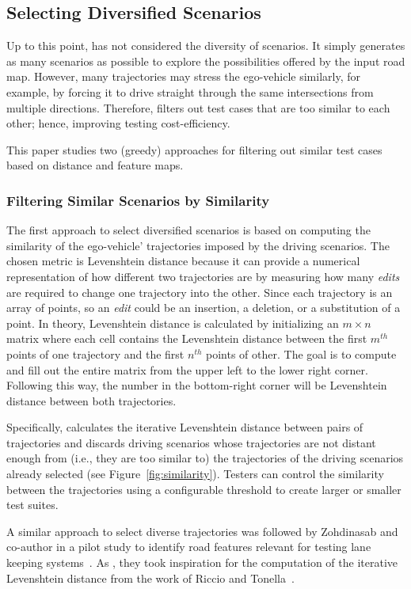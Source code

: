 \documentclass[conference]{IEEEtran}
\begin{document}
\subsection{Selecting Diversified Scenarios}
Up to this point, \tool has not considered the diversity of scenarios. It simply generates as many scenarios as possible to explore the possibilities offered by the input road map. However, many trajectories may stress the ego-vehicle similarly, for example, by forcing it to drive straight through the same intersections from multiple directions. Therefore, \tool filters out test cases that are too similar to each other; hence, improving testing cost-efficiency.

This paper studies two (greedy) approaches for filtering out similar test cases based on distance and feature maps.

\subsubsection{Filtering Similar Scenarios by Similarity}
The first approach to select diversified scenarios is based on computing the similarity of the ego-vehicle' trajectories imposed by the driving scenarios. The chosen metric is Levenshtein distance because it can provide a numerical representation of how different two trajectories are by measuring how many \emph{edits} are required to change one trajectory into the other. Since each trajectory is an array of points, so an \emph{edit} could be an insertion, a deletion, or a substitution of a point. In theory, Levenshtein distance is calculated by initializing an  $m\times n$ matrix where each cell contains the Levenshtein distance between the first $m^{th}$ points of one trajectory and the first $n^{th}$ points of other. The goal is to compute and fill out the entire matrix from the upper left to the lower right corner. Following this way, the number in the bottom-right corner will be Levenshtein distance between both trajectories.
%

Specifically, \tool calculates the iterative Levenshtein distance between pairs of trajectories and discards driving scenarios whose trajectories are not distant enough from (i.e., they are too similar to) the trajectories of the driving scenarios already selected (see Figure~\ref{fig:similarity}).
%
Testers can control the similarity between the trajectories using a configurable threshold to create larger or smaller test suites. 


A similar approach to select diverse trajectories was followed by Zohdinasab and co-author in a pilot study to identify road features relevant for testing lane keeping systems~\cite{DBLP:conf/issta/ZohdinasabRGT21}.
As \tool, they took inspiration for the computation of the iterative Levenshtein distance from the work of Riccio and Tonella~\cite{DBLP:conf/sigsoft/RiccioT20}.
\end{document}
